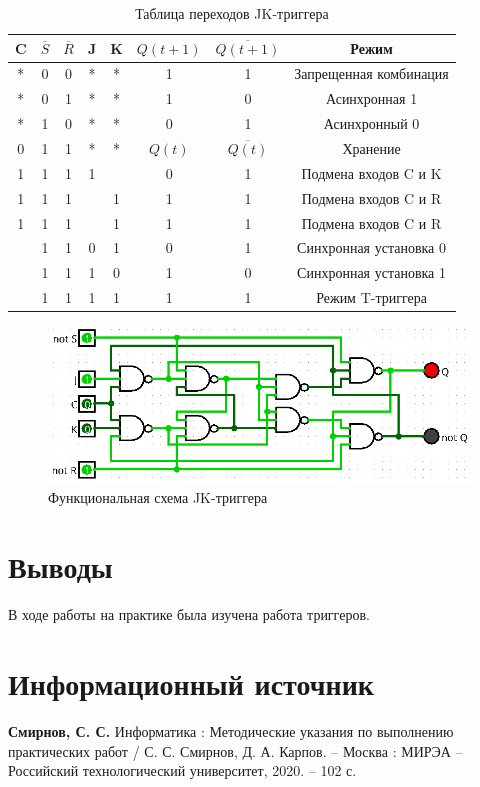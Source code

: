 \documentclass[14pt, a4paper]{extreport}
\newcommand\clocktb{%
	\begin{tikzpicture}[scale=0.25pt]
		\draw (0,1) -- (1,1) -- (1,0) -- (2,0);
	\end{tikzpicture}%
}
\begin{document}
\begin{table}[H]
	\caption{Таблица переходов JK-триггера}
	\label{tab:jk}
	\begin{tabular}{|c|c|c|c|c|c|c|c|}
		\hline
		C & $\overline{S}$ & $\overline{R}$ & J & K & $Q(t + 1)$ & $\overline{Q(t + 1)}$ & Режим \\
		\hline
		* & 0 & 0 & * & * & 1 & 1 & Запрещенная комбинация \\
		\hline
		* & 0 & 1 & * & * & 1 & 0 & Асинхронная 1 \\
		\hline
		* & 1 & 0 & * & * & 0 & 1 & Асинхронный 0 \\
		\hline
		0 & 1 & 1 & * & * & $Q(t)$ & $\overline{Q(t)}$ & Хранение \\
		\hline
		1 & 1 & 1 & 1 & \clocktb & 0 & 1 & Подмена входов C и K \\
		\hline
		1 & 1 & 1 & \clocktb & 1 & 1 & 1 & Подмена входов C и R \\
		\hline
		1 & 1 & 1 & \clocktb & 1 & 1 & 1 & Подмена входов C и R \\
		\hline
		\clocktb & 1 & 1 & 0 & 1 & 0 & 1 & Синхронная установка 0 \\
		\hline
		\clocktb & 1 & 1 & 1 & 0 & 1 & 0 & Синхронная установка 1 \\
		\hline
		\clocktb & 1 & 1 & 1 & 1 & 1 & 1 & Режим T-триггера \\
		\hline
	\end{tabular}
\end{table}

\begin{figure}[H]
	\caption{Функциональная схема JK-триггера}
	\label{fig:jk}
	\includegraphics[width=\textwidth]{jk}
\end{figure}

\chapter{Выводы}
В ходе работы на практике была изучена работа триггеров.

\chapter{Информационный источник}
\textbf{Смирнов, С. С.} Информатика : Методические указания по выполнению практических работ / С. С. Смирнов, Д. А. Карпов. -- Москва : МИРЭА -- Российский технологический университет, 2020. -- 102 с.
\end{document}
